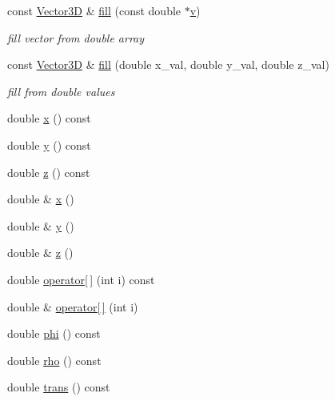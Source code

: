 \begin{DoxyCompactItemize}
const \hyperlink{class_d_d_surfaces_1_1_vector3_d}{Vector3D} \& \hyperlink{class_d_d_surfaces_1_1_vector3_d_a885f3dc7b3cfb7aea34c282b2ab01401}{fill} (const double $\ast$\hyperlink{_multi_view_8cpp_a8320ee13ac034dbf6d624fe8953dd337}{v})
\begin{DoxyCompactList}\small\item\em fill vector from double array \end{DoxyCompactList}\item 
const \hyperlink{class_d_d_surfaces_1_1_vector3_d}{Vector3D} \& \hyperlink{class_d_d_surfaces_1_1_vector3_d_a6576119c90b9e05b6046506de6b1f87e}{fill} (double x\+\_\+val, double y\+\_\+val, double z\+\_\+val)
\begin{DoxyCompactList}\small\item\em fill from double values \end{DoxyCompactList}\item 
double \hyperlink{class_d_d_surfaces_1_1_vector3_d_a08e4c3ffc5f8b352a7913bc131b1ffa6}{x} () const
\item 
double \hyperlink{class_d_d_surfaces_1_1_vector3_d_a553ea5b00ce2220e35c9cd6526a89fa6}{y} () const
\item 
double \hyperlink{class_d_d_surfaces_1_1_vector3_d_a12806622b73dbf8875b9a18f9c4bf45f}{z} () const
\item 
double \& \hyperlink{class_d_d_surfaces_1_1_vector3_d_a42067b3c5580bcb067a91e27c0c99352}{x} ()
\item 
double \& \hyperlink{class_d_d_surfaces_1_1_vector3_d_a0ff1549e1a9f987f22f84bc4e86605db}{y} ()
\item 
double \& \hyperlink{class_d_d_surfaces_1_1_vector3_d_a3318b2914eff5012a878d22c373e9e08}{z} ()
\item 
double \hyperlink{class_d_d_surfaces_1_1_vector3_d_af72e511ff37ee15355eae8a73f40424e}{operator\mbox{[}$\,$\mbox{]}} (int i) const
\item 
double \& \hyperlink{class_d_d_surfaces_1_1_vector3_d_ae4e1eca62cf8f1cae89ab8b8e2f2f132}{operator\mbox{[}$\,$\mbox{]}} (int i)
\item 
double \hyperlink{class_d_d_surfaces_1_1_vector3_d_a57ee8078f7b734b05fb5da8165c0a499}{phi} () const
\item 
double \hyperlink{class_d_d_surfaces_1_1_vector3_d_a4db116a437a53fbda202b24d995633ff}{rho} () const
\item 
double \hyperlink{class_d_d_surfaces_1_1_vector3_d_a48d0c066e59e6307b0ccbb950deab045}{trans} () const
\item 

\end{DoxyCompactItemize}
